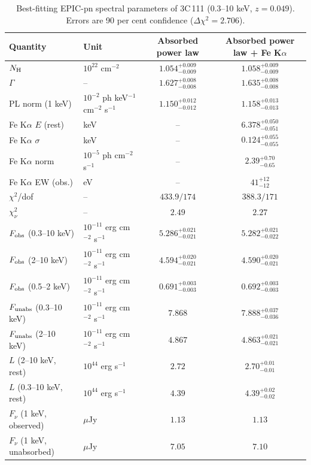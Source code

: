 \begin{table}
\centering
\caption{Best-fitting EPIC-pn spectral parameters of 3C\,111 (0.3--10 keV, $z=0.049$). Errors are 90 per cent confidence ($\Delta\chi^2=2.706$).}
\begin{tabular}{llcc}
\hline
Quantity & Unit & Absorbed power law & Absorbed power law + Fe K$\alpha$ \\
\hline
$N_{\rm H}$ & $10^{22}$ cm$^{-2}$ & $1.054^{+0.009}_{-0.009}$ & $1.058^{+0.009}_{-0.009}$ \\
$\Gamma$ & -- & $1.627^{+0.008}_{-0.008}$ & $1.635^{+0.008}_{-0.008}$ \\
PL norm (1 keV) & $10^{-2}$ ph keV$^{-1}$ cm$^{-2}$ s$^{-1}$ & $1.150^{+0.012}_{-0.012}$ & $1.158^{+0.013}_{-0.013}$ \\
Fe K$\alpha$ $E$ (rest) & keV & -- & $6.378^{+0.050}_{-0.051}$ \\
Fe K$\alpha$ $\sigma$ & keV & -- & $0.124^{+0.055}_{-0.055}$ \\
Fe K$\alpha$ norm & $10^{-5}$ ph cm$^{-2}$ s$^{-1}$ & -- & $2.39^{+0.70}_{-0.65}$ \\
Fe K$\alpha$ EW (obs.) & eV & -- & $41^{+12}_{-12}$ \\
$\chi^2$/dof & -- & $433.9/174$ & $388.3/171$ \\
$\chi^2_\nu$ & -- & $2.49$ & $2.27$ \\
$F_{\rm obs}$ (0.3--10 keV) & $10^{-11}$ erg cm$^{-2}$ s$^{-1}$ & $5.286^{+0.021}_{-0.021}$ & $5.282^{+0.021}_{-0.022}$ \\
$F_{\rm obs}$ (2--10 keV) & $10^{-11}$ erg cm$^{-2}$ s$^{-1}$ & $4.594^{+0.020}_{-0.021}$ & $4.590^{+0.020}_{-0.021}$ \\
$F_{\rm obs}$ (0.5--2 keV) & $10^{-11}$ erg cm$^{-2}$ s$^{-1}$ & $0.691^{+0.003}_{-0.003}$ & $0.692^{+0.003}_{-0.003}$ \\
$F_{\rm unabs}$ (0.3--10 keV) & $10^{-11}$ erg cm$^{-2}$ s$^{-1}$ & $7.868$ & $7.888^{+0.037}_{-0.036}$ \\
$F_{\rm unabs}$ (2--10 keV) & $10^{-11}$ erg cm$^{-2}$ s$^{-1}$ & $4.867$ & $4.863^{+0.021}_{-0.021}$ \\
$L$ (2--10 keV, rest) & $10^{44}$ erg s$^{-1}$ & $2.72$ & $2.70^{+0.01}_{-0.01}$ \\
$L$ (0.3--10 keV, rest) & $10^{44}$ erg s$^{-1}$ & $4.39$ & $4.39^{+0.02}_{-0.02}$ \\
$F_\nu$ (1 keV, observed) & $\mu$Jy & $1.13$ & $1.13$ \\
$F_\nu$ (1 keV, unabsorbed) & $\mu$Jy & $7.05$ & $7.10$ \\
\hline
\end{tabular}
\end{table}
